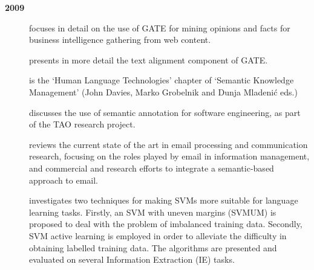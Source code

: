 \textbf{2009}
%
\begin{description}

\item[\cite{Saggion09}] focuses in detail on the use of GATE for mining opinions and facts for business intelligence gathering from web content.

\item[\cite{Aswani09}] presents in more detail the text alignment component of GATE.

\item[\cite{Bontcheva09a}] is the `Human Language Technologies' chapter of `Semantic Knowledge Management' (John Davies, Marko Grobelnik and Dunja Mladenić eds.)

\item[\cite{DamljanovicAB09}] discusses the use of semantic annotation for software engineering, as part of the TAO research project.

\item[\cite{Laclavik09}] reviews the current state of the art in email processing and communication research, focusing on the roles played by email in information management, and commercial and research efforts to integrate a semantic-based approach to email.

\item[\cite{Yaoyong09a}] investigates two techniques
for making SVMs more suitable for language learning tasks. Firstly, an
SVM with uneven margins (SVMUM) is proposed to deal with the problem
of imbalanced training data.  Secondly, SVM active learning is
employed in order to alleviate the difficulty in obtaining labelled
training data. The algorithms are presented and evaluated on several
Information Extraction (IE) tasks.
 

\end{description}

